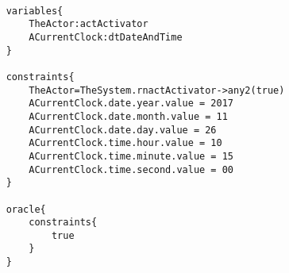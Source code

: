 	\scriptsize
	\vspace{0.5cm}
	\begin{lstlisting}[style=MessirStyle,firstnumber=auto,captionpos=b,caption={\msrmessir (MCL-oriented) specification of the test step \emph{testcase01-ts06oeSetClock02}.},label=TM-testcase01-ts06oeSetClock02-MCL-LST]

	variables{
		TheActor:actActivator
		ACurrentClock:dtDateAndTime
	}
	
	constraints{
		TheActor=TheSystem.rnactActivator->any2(true)
		ACurrentClock.date.year.value = 2017
		ACurrentClock.date.month.value = 11
		ACurrentClock.date.day.value = 26
		ACurrentClock.time.hour.value = 10
		ACurrentClock.time.minute.value = 15
		ACurrentClock.time.second.value = 00
	}
	
	oracle{
		constraints{
			true
		}
	}
	
	\end{lstlisting}
	\normalsize 
	
	
